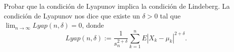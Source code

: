 
\begin{problem}[12]Probar que la condici\'on de Lyapunov implica la condici\'on de Lindeberg. 
La condici\'on de Lyapunov nos dice que existe un $\delta > 0$ tal que
$\lim_{n\to \infty} Lyap(n, \delta) = 0$, donde 
$$
Lyap(n, \delta) := \frac{1}{s_n^{2 + \delta}} \sum_{k=1}^n  E|X_k - \mu_k|^{2 + \delta} .
$$



\solution




\end{problem}





